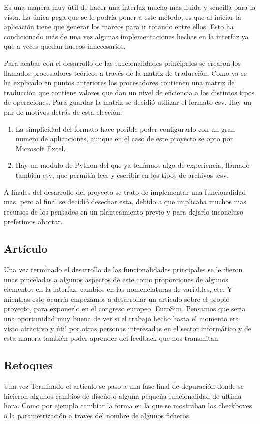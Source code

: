 Es una manera muy útil de hacer una interfaz mucho mas fluida y sencilla para la vista. La única pega que se le podría poner a este método, es que al iniciar la aplicación tiene que generar los marcos para ir rotando entre ellos. Esto ha condicionado más de una vez algunas implementaciones hechas en la interfaz ya que a veces quedan huecos innecesarios.\\



Para acabar con el desarrollo de las funcionalidades principales se crearon los llamados procesadores teóricos a través de la matriz de traducción. Como ya se ha explicado en puntos anteriores los procesadores contienen una matriz de traducción que contiene valores que dan un nivel de eficiencia a los distintos tipos de operaciones. Para guardar la matriz se decidió utilizar el formato csv. Hay un par de motivos detrás de esta elección:\\

\begin{enumerate}
	\item La simplicidad del formato hace posible poder configurarlo con un gran numero de aplicaciones, aunque en el caso de este proyecto se opto por Microsoft Excel.
	\item Hay un modulo de Python del que ya teníamos algo de experiencia, llamado también csv, que permitía leer y escribir en los tipos de archivos .csv.
\end{enumerate}


A finales del desarrollo del proyecto se trato de implementar una funcionalidad mas, pero al final  se decidió desechar esta, debido a que implicaba muchos mas recursos de los pensados en un planteamiento previo y para dejarlo inconcluso preferimos abortar.\\

\subsection{Artículo}

Una vez terminado el desarrollo de las funcionalidades principales se le dieron unas pinceladas a algunos aspectos de este como proporciones de algunos  elementos en la interfaz, cambios en las nomenclaturas de variables, etc. Y mientras esto ocurría empezamos a desarrollar un articulo sobre el propio proyecto, para exponerlo en el congreso europeo, EuroSim. Pensamos que seria una oportunidad muy buena  de ver si el trabajo hecho hasta el momento era visto atractivo y útil por otras personas interesadas en el sector informático y de esta manera también poder aprender del feedback que nos transmitan.

\subsection{Retoques}
Una vez Terminado el artículo se paso a una fase final de depuración donde se hicieron algunos cambios de diseño o alguna pequeña funcionalidad de ultima hora. Como por ejemplo cambiar la forma en la que se mostraban los checkboxes o la parametrización a través del nombre de algunos ficheros.
